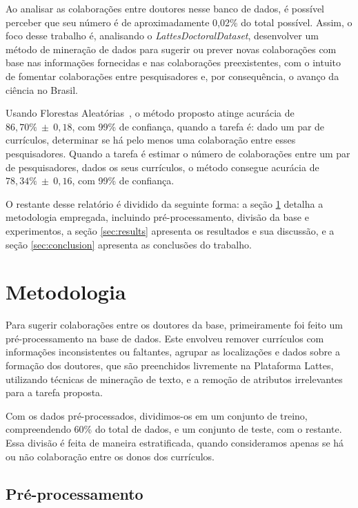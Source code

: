 \documentclass[12pt]{article}
\begin{document}
Ao analisar as colaborações entre doutores nesse banco de dados, é possível perceber que seu número é de aproximadamente 0,02\% do total possível.
Assim, o foco desse trabalho é, analisando o \emph{LattesDoctoralDataset}, desenvolver um método de mineração de dados para sugerir ou prever novas colaborações com base nas informações fornecidas e nas colaborações preexistentes, com o intuito de fomentar colaborações entre pesquisadores e, por consequência, o avanço da ciência no Brasil.

Usando Florestas Aleatórias~\cite{random-forests}, o método proposto atinge acurácia de $86,70\%~\pm~0,18$, com 99\% de confiança, quando a tarefa é: dado um par de currículos, determinar se há pelo menos uma colaboração entre esses pesquisadores.
Quando a tarefa é estimar o número de colaborações entre um par de pesquisadores, dados os seus currículos, o método consegue acurácia de $78,34\%~\pm~0,16$, com 99\% de confiança.

O restante desse relatório é dividido da seguinte forma: a seção \ref{sec:methods} detalha a metodologia empregada, incluindo pré-processamento, divisão da base e experimentos, a seção \ref{sec:results} apresenta os resultados e sua discussão, e a seção \ref{sec:conclusion} apresenta as conclusões do trabalho.

\section{Metodologia}
\label{sec:methods}


Para sugerir colaborações entre os doutores da base, primeiramente foi feito um pré-processamento na base de dados.
Este envolveu remover currículos com informações inconsistentes ou faltantes, agrupar as localizações e dados sobre a formação dos doutores, que são preenchidos livremente na Plataforma Lattes, utilizando técnicas de mineração de texto, e a remoção de atributos irrelevantes para a tarefa proposta.

Com os dados pré-processados, dividimos-os em um conjunto de treino, compreendendo 60\% do total de dados, e um conjunto de teste, com o restante.
Essa divisão é feita de maneira estratificada, quando consideramos apenas se há ou não colaboração entre os donos dos currículos.

\subsection{Pré-processamento}
\label{sec:preprocess}
\end{document}

